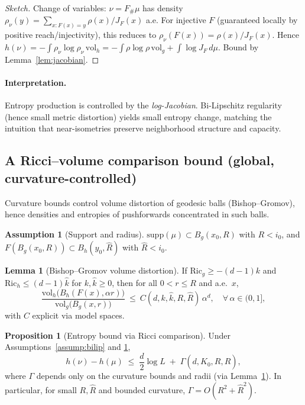 \documentclass{article}
\theoremstyle{definition}
\newtheorem{assumption}{Assumption}[section]
\newtheorem{lemma}[theorem]{Lemma}
\newtheorem{proposition}[theorem]{Proposition}
\begin{document}
\begin{proof}[Sketch]
Change of variables:
\( \nu = F_\#\mu \) has density
\( \rho_\nu(y) = \sum_{x:F(x)=y} \rho(x)/J_F(x) \) a.e.
For injective \(F\) (guaranteed locally by positive reach/injectivity), this reduces to
\(\rho_\nu(F(x))=\rho(x)/J_F(x)\).
Hence \(h(\nu)=-\!\int \rho_\nu\log\rho_\nu\,\mathrm{vol}_h
= -\!\int \rho\log\rho\,\mathrm{vol}_g + \int \log J_F\, d\mu\).
Bound by Lemma~\ref{lem:jacobian}.
\end{proof}

\paragraph{Interpretation.}
Entropy production is controlled by the \emph{log-Jacobian}. Bi-Lipschitz
regularity (hence small metric distortion) yields small entropy change, matching
the intuition that near-isometries preserve neighborhood structure and capacity.

\subsection{A Ricci--volume comparison bound (global, curvature-controlled)}

Curvature bounds control volume distortion of geodesic balls (Bishop--Gromov),
hence densities and entropies of pushforwards concentrated in such balls.

\begin{assumption}[Support and radius]
\label{assump:support}
\(\mathrm{supp}(\mu)\subset B_g(x_0,R)\) with \(R<i_0\), and
\(F(B_g(x_0,R))\subset B_h(y_0,\widehat R)\) with \(\widehat R<i_0\).
\end{assumption}

\begin{lemma}[Bishop--Gromov volume distortion]
\label{lem:BG}
If \(\mathrm{Ric}_g\ge -(d-1)k\) and \(\mathrm{Ric}_h\le (d-1)\widehat k\) for \(k,\widehat k\ge 0\),
then for all \(0<r\le R\) and a.e.\ \(x\),
\[
\frac{\mathrm{vol}_h\big(B_h(F(x),\alpha r)\big)}{\mathrm{vol}_g\big(B_g(x,r)\big)}
\ \le\ C(d,k,\widehat k,R,\widehat R)\,\alpha^d,
\quad \forall\,\alpha\in(0,1],
\]
with \(C\) explicit via model spaces.
\end{lemma}

\begin{proposition}[Entropy bound via Ricci comparison]
\label{prop:entropy-ricci}
Under Assumptions~\ref{assump:bilip} and \ref{assump:support},
\[
h(\nu) - h(\mu) \;\le\; \frac{d}{2}\log L \;+\; \Gamma(d,K_0,R,\widehat R),
\]
where \(\Gamma\) depends only on the curvature bounds and radii (via
Lemma~\ref{lem:BG}). In particular, for small \(R,\widehat R\) and bounded
curvature, \(\Gamma = O(R^2+\widehat R^2)\).
\end{proposition}
\end{document}
